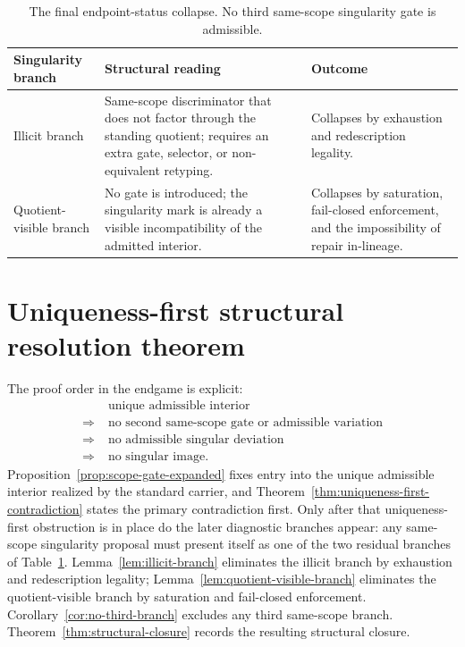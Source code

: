 \begin{table}[t]
\centering
\begin{tabular}{>{\raggedright\arraybackslash}p{} >{\raggedright\arraybackslash}p{} >{\raggedright\arraybackslash}p{}}
\toprule
\textbf{Singularity branch} & \textbf{Structural reading} & \textbf{Outcome} \\
\midrule
Illicit branch & Same-scope discriminator that does not factor through the standing quotient; requires an extra gate, selector, or non-equivalent retyping. & Collapses by exhaustion and redescription legality. \\
\addlinespace
Quotient-visible branch & No gate is introduced; the singularity mark is already a visible incompatibility of the admitted interior. & Collapses by saturation, fail-closed enforcement, and the impossibility of repair in-lineage. \\
\bottomrule
\end{tabular}
\caption{The final endpoint-status collapse. No third same-scope singularity gate is admissible.}
\label{tab:final-dichotomy}
\end{table}

\section{Uniqueness-first structural resolution theorem}
The proof order in the endgame is explicit:
\[
\begin{aligned}
&\text{unique admissible interior}\\
\Longrightarrow\;&\text{no second same-scope gate or admissible variation}\\
\Longrightarrow\;&\text{no admissible singular deviation}\\
\Longrightarrow\;&\text{no singular image.}
\end{aligned}
\]
Proposition~\ref{prop:scope-gate-expanded} fixes entry into the unique admissible interior realized by the standard carrier, and Theorem~\ref{thm:uniqueness-first-contradiction} states the primary contradiction first. Only after that uniqueness-first obstruction is in place do the later diagnostic branches appear: any same-scope singularity proposal must present itself as one of the two residual branches of Table~\ref{tab:final-dichotomy}. Lemma~\ref{lem:illicit-branch} eliminates the illicit branch by exhaustion and redescription legality; Lemma~\ref{lem:quotient-visible-branch} eliminates the quotient-visible branch by saturation and fail-closed enforcement. Corollary~\ref{cor:no-third-branch} excludes any third same-scope branch. Theorem~\ref{thm:structural-closure} records the resulting structural closure.

